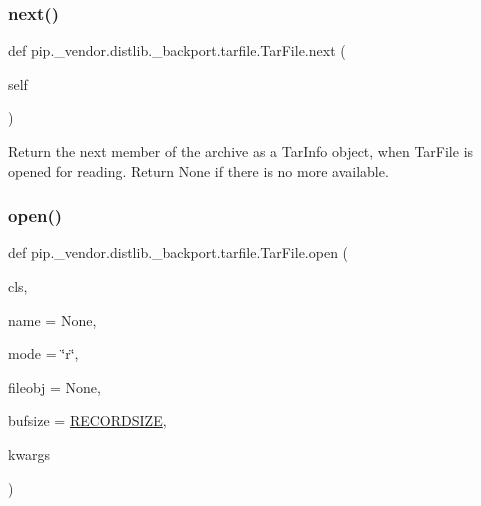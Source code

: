 \subsubsection{\texorpdfstring{next()}{next()}}
{\footnotesize\ttfamily def pip.\+\_\+vendor.\+distlib.\+\_\+backport.\+tarfile.\+Tar\+File.\+next (\begin{DoxyParamCaption}\item[{}]{self }\end{DoxyParamCaption})}

\begin{DoxyVerb}Return the next member of the archive as a TarInfo object, when
   TarFile is opened for reading. Return None if there is no more
   available.
\end{DoxyVerb}
 \mbox{\label{classpip_1_1__vendor_1_1distlib_1_1__backport_1_1tarfile_1_1TarFile_a345166f9cf5fef693205404fa47557e2}} 
\subsubsection{\texorpdfstring{open()}{open()}}
{\footnotesize\ttfamily def pip.\+\_\+vendor.\+distlib.\+\_\+backport.\+tarfile.\+Tar\+File.\+open (\begin{DoxyParamCaption}\item[{}]{cls,  }\item[{}]{name = {\ttfamily None},  }\item[{}]{mode = {\ttfamily \char`\"{}r\char`\"{}},  }\item[{}]{fileobj = {\ttfamily None},  }\item[{}]{bufsize = {\ttfamily \hyperlink{namespacepip_1_1__vendor_1_1distlib_1_1__backport_1_1tarfile_a7cdfc64e9ef356ed8f0094cd0610c2aa}{R\+E\+C\+O\+R\+D\+S\+I\+ZE}},  }\item[{}]{kwargs }\end{DoxyParamCaption})}


